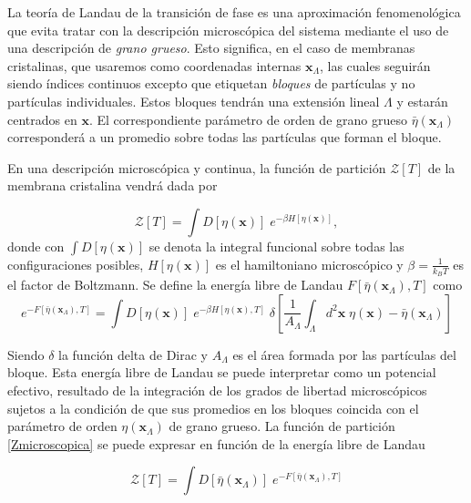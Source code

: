 La teoría de Landau de la transición de fase es una aproximación
fenomenológica que evita tratar con la descripción microscópica del sistema
mediante el uso de una descripción de \textit{grano grueso}. Esto significa,
en el caso de membranas cristalinas, que usaremos como coordenadas internas
$\mathbf{x}_{\Lambda}$, las cuales seguirán  siendo índices continuos excepto
que etiquetan \textit{bloques} de partículas y no partículas
individuales. Estos bloques tendrán una extensión lineal $\Lambda$ y estarán
centrados en $\mathbf{x}$. El correspondiente parámetro de orden de grano
grueso $\bar{\eta}(\mathbf{x}_{\Lambda})$ corresponderá a un promedio sobre
todas las partículas que forman el bloque.

En una descripción microscópica y continua, la función de partición
$\mathcal{Z}[T]$ de la membrana cristalina vendrá dada por

\begin{equation}\label{Zmicroscopica}
\mathcal{Z}[T]=\int D[\eta(\mathbf{x})]\; e^{-\beta H[\eta(\mathbf{x})]},
\end{equation}
donde con $\int D[\eta(\mathbf{x})]$ se denota la integral funcional sobre
todas las configuraciones posibles, $H[\eta(\mathbf{x})]$ es el hamiltoniano
microscópico y $\beta=\frac{1}{k_BT}$ es el factor de Boltzmann. Se define la
energía libre de Landau 
$F[\bar{\eta}(\mathbf{x}_{\Lambda}),T]$ como 
\begin{equation*}
e^{-F[\bar{\eta}(\mathbf{x}_{\Lambda}),T]}=\int D[\eta(\mathbf{x})]\; e^{-\beta
  H[\eta(\mathbf{x}),T]}
  \;\delta\left[\frac{1}{A_{\Lambda}}\int_{\Lambda} d^2\mathbf{x}\; \eta(\mathbf{x})-\bar{\eta}(\mathbf{x}_{\Lambda})\right]
\end{equation*}

Siendo $\delta$ la función delta de Dirac y $A_{\Lambda}$ es el área
formada por las partículas del bloque. Esta energía libre de Landau se puede
interpretar como un potencial efectivo, resultado de la integración de los
grados de libertad microscópicos sujetos a la condición de que sus promedios
en los  bloques coincida con el parámetro de orden
$\eta(\mathbf{x}_{\Lambda})$ de grano grueso. La función de partición
\eqref{Zmicroscopica} se puede expresar en función de la energía libre de
Landau

\begin{equation*}
\mathcal{Z}[T]=\int D[\bar{\eta}(\mathbf{x}_{\Lambda})]\; e^{-F[\bar{\eta}(\mathbf{x}_{\Lambda}),T]}
\end{equation*}

